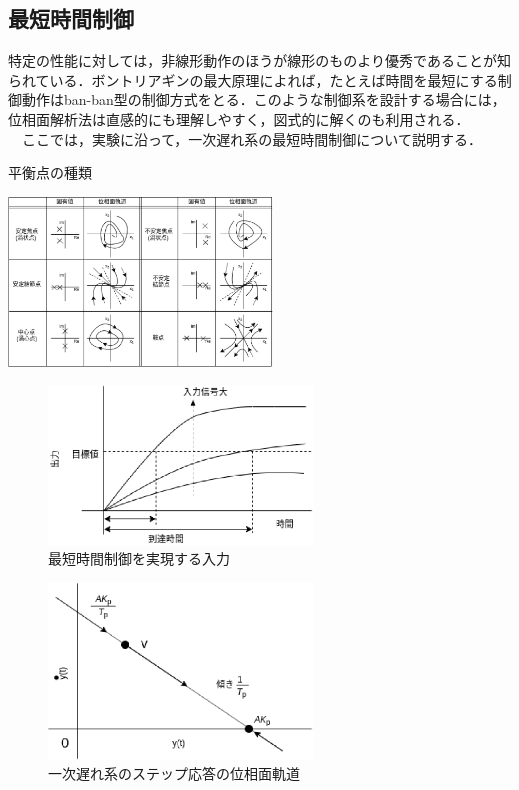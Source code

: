 \documentclass[12pt]{jsarticle}
\begin{document}
\subsection{最短時間制御}
特定の性能に対しては，非線形動作のほうが線形のものより優秀であることが知られている．ボントリアギンの最大原理によれば，たとえば時間を最短にする制御動作はban-ban型の制御方式をとる．このような制御系を設計する場合には，位相面解析法は直感的にも理解しやすく，図式的に解くのも利用される．\\
　ここでは，実験に沿って，一次遅れ系の最短時間制御について説明する．\\
\begin{table}[tb]
  \begin{center}
    \caption{平衡点の種類}
    \includegraphics[clip,width=7.0cm]{../Img/FigC1.eps}
    \label{FigC1}
  \end{center}
\end{table}
\begin{figure}[H]
  \begin{center}
    \includegraphics[clip,width=7.0cm]{../Img/FigC4.eps}
    \caption{最短時間制御を実現する入力}
    \label{FigC4}
  \end{center}
\end{figure}
\begin{figure}[H]
  \begin{center}
    \includegraphics[clip,width=7.0cm]{../Img/FigC5.eps}
    \caption{一次遅れ系のステップ応答の位相面軌道}
    \label{FigC5}
  \end{center}
\end{figure}
\end{document}
